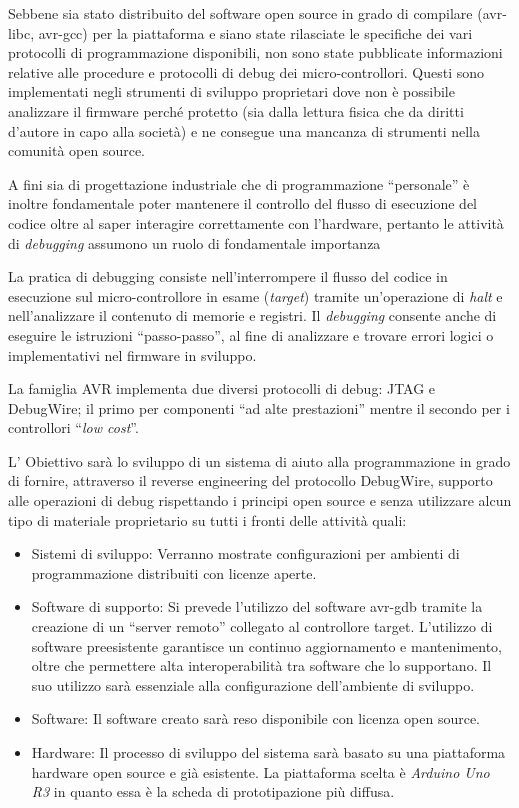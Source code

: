 Sebbene sia stato distribuito del software open source in grado di compilare (avr-libc\cite{site:avr-libc}, avr-gcc\cite{site:avr-gcc}) per la piattaforma e siano state rilasciate le specifiche dei vari protocolli di programmazione disponibili\cite{avr:appnote:isp}\cite{avr:appnote:tpi}\cite{avr:appnote:pdi}, non sono state pubblicate informazioni relative alle procedure e protocolli di debug dei micro-controllori. 
Questi sono implementati negli strumenti di sviluppo proprietari dove non è possibile analizzare il firmware perché protetto (sia dalla lettura fisica che da diritti d'autore in capo alla società) e ne consegue una mancanza di strumenti nella comunità open source.

A fini sia di progettazione industriale che di programmazione ``personale'' è inoltre fondamentale poter mantenere il controllo del flusso di esecuzione del codice oltre al saper interagire correttamente con l'hardware, pertanto le attività di \textit{debugging} assumono un ruolo di fondamentale importanza

La pratica di debugging consiste nell'interrompere il flusso del codice in esecuzione sul micro-controllore in esame (\textit{target}) tramite un'operazione di \textit{halt} e nell'analizzare il contenuto di memorie e registri. Il \textit{debugging} consente anche di eseguire le istruzioni ``passo-passo'', al fine di analizzare e trovare errori logici o implementativi nel firmware in sviluppo.

La famiglia AVR implementa due diversi protocolli di debug: JTAG e DebugWire; il primo per componenti ``ad alte prestazioni'' mentre il secondo per i controllori ``\textit{low cost}''.

L' Obiettivo sarà lo sviluppo di un sistema di aiuto alla programmazione in grado di fornire, attraverso il reverse engineering del protocollo DebugWire\cite{site:dw-reverse-engeneering}, supporto alle operazioni di debug rispettando i principi open source e senza utilizzare alcun tipo di materiale proprietario su tutti i fronti delle attività quali:
\begin{itemize}
    \item Sistemi di sviluppo: Verranno mostrate configurazioni per ambienti di programmazione distribuiti con licenze aperte. 
    \item Software di supporto: Si prevede l'utilizzo del software avr-gdb\cite{site:gdb} tramite la creazione di un ``server remoto'' collegato al controllore target. L'utilizzo di software preesistente garantisce un continuo aggiornamento e mantenimento, oltre che permettere alta interoperabilità tra software che lo supportano. Il suo utilizzo sarà essenziale alla configurazione dell'ambiente di sviluppo.
    \item Software: Il software creato sarà reso disponibile con licenza open source.
    \item Hardware: Il processo di sviluppo del sistema sarà basato su una piattaforma hardware open source e già esistente. La piattaforma scelta è \textit{Arduino Uno R3} in quanto essa è la scheda di prototipazione più diffusa.
\end{itemize}

